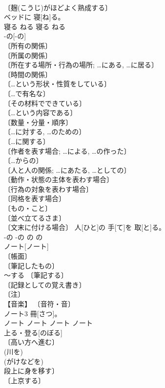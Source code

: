 \documentclass[8pt]{extreport}
\begin{document}
\begin{CJK}{UTF8}{min}
\\	〔麹(こうじ)がほどよく熟成する〕 
\\	ベッドに 寝[ね]る。	
\\	寝る	ねる	寝る	ねる	
\\	-の[-の]	
\\	〔所有の関係〕 
\\	〔所属の関係〕 
\\	〔所在する場所・行為の場所; …にある, …に居る〕 
\\	〔時間の関係〕 
\\	〔…という形状・性質をしている〕 
\\	〔…で有名な〕 
\\	〔その材料でできている〕 
\\	〔…という内容である〕 
\\	〔数量・分量・順序〕 
\\	〔…に対する, …のための〕 
\\	〔…に関する〕 
\\	〔作者を表す場合; …による, …の作った〕 
\\	〔…からの〕 
\\	〔人と人の関係; …にあたる, …としての〕 
\\	〔動作・状態の主体を表わす場合〕 
\\	〔行為の対象を表わす場合〕 
\\	〔同格を表す場合〕 
\\	〔もの・こと〕 
\\	〔並べ立てるさま〕 
\\	〔文末に付ける場合〕	人[ひと]の 手[て]を 取[と]る。	
\\	-の	-の	の	の				
\\	ノート[ノート]	
\\	〔帳面〕 
\\	〔筆記したもの〕 
\\	～する 〔筆記する〕 
\\	〔記録としての覚え書き〕 
\\	〔注〕 
\\	【音楽】 〔音符・音〕 
\\	ノート3 冊[さつ]。	
\\	ノート	ノート	ノート	ノート	
\\	上る・登る[のぼる]	
\\	〔高い方へ進む〕 
\\	(川を) 
\\	(がけなどを) 
\\	段上に身を移す〕 
\\	〔上京する〕 

\end{CJK}
\end{document}
